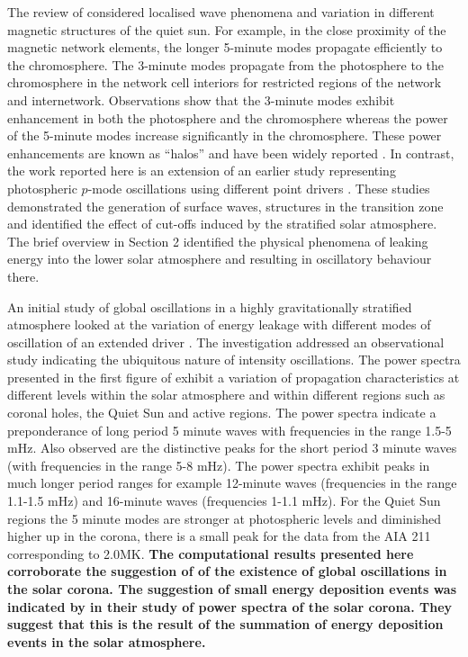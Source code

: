 \documentclass[physics,article,submit,pdftex,moreauthors]{Definitions/mdpi}
\begin{document}
The  review of \cite{Khomenko2013} considered localised wave phenomena and variation in different magnetic structures of the quiet sun. For example, in the close proximity of the magnetic network elements, the longer 5-minute modes propagate efficiently to the chromosphere. The 3-minute modes propagate from the photosphere to the chromosphere in the network cell interiors for restricted regions of the network and internetwork.  Observations show that the 3-minute modes exhibit enhancement in both the photosphere and the chromosphere whereas the power of the 5-minute modes increase significantly in the chromosphere. These power enhancements are known as “halos” and have been widely reported \cite{Kontogiannis2010}. 
In contrast, the work reported here is an extension of an earlier study representing photospheric $p$-mode oscillations using different point drivers  \cite{Malins2007}. These studies demonstrated  the generation of surface waves, structures in the transition zone and identified the effect of cut-offs induced by the stratified  solar atmosphere. The  brief overview in Section 2 identified the physical phenomena of leaking energy into the lower solar atmosphere and resulting in oscillatory behaviour there.

An initial study of global oscillations in a highly gravitationally stratified atmosphere looked at the variation of energy leakage with different modes of oscillation of an extended driver \cite{Griffiths2018b}. The investigation addressed an observational study indicating the ubiquitous nature of intensity oscillations. The power spectra presented in the first figure of \cite{Griffiths2018b} exhibit a variation of propagation characteristics at different levels within the solar atmosphere and within different regions such as coronal holes, the Quiet Sun and active regions. The power spectra indicate a preponderance of long period 5 minute waves with frequencies in the range 1.5-5 mHz. Also observed are the distinctive peaks for the short period 3 minute waves (with frequencies in the range 5-8 mHz). The power spectra exhibit  peaks in much longer period ranges for example 12-minute waves  (frequencies in the range 1.1-1.5 mHz)  and 16-minute waves (frequencies 1-1.1 mHz). For the Quiet Sun regions the 5 minute modes are stronger at photospheric levels and diminished higher up in the corona, there is a small peak for the data from the AIA 211 corresponding to 2.0MK. {\bf The computational results presented here corroborate the suggestion of \cite{Didkovsky2013} of the existence of global oscillations in the solar corona. The suggestion of small energy deposition events was indicated by \cite{Ireland2015} in their study of power spectra of the solar corona. They suggest that this is the result of the summation of energy deposition events in the solar atmosphere.} 
\end{document}
